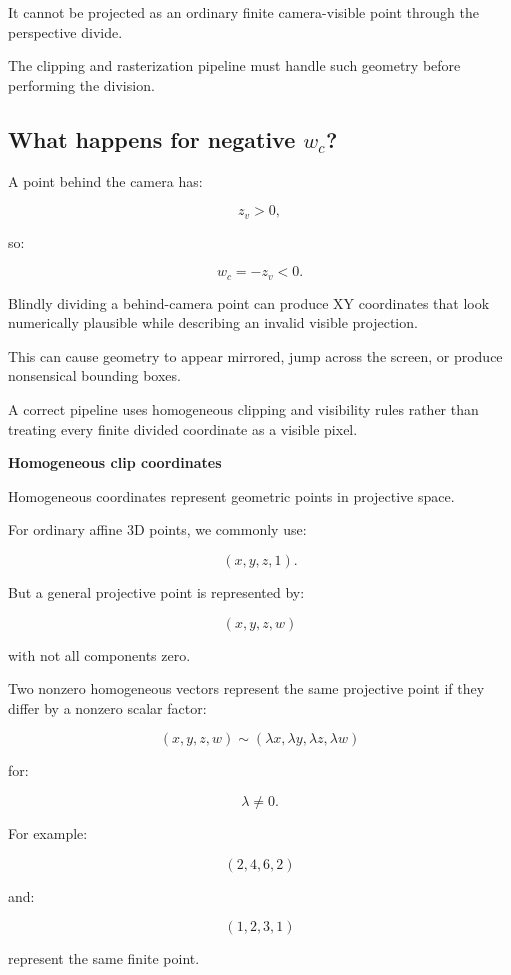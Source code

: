 It cannot be projected as an ordinary finite camera-visible point through the perspective divide.

The clipping and rasterization pipeline must handle such geometry before performing the division.

\subsection{\texorpdfstring{What happens for negative \(w_c\)?}{What happens for negative w\_c?}}\label{02-foundations-ii-ch033-what-happens-for-negative-w_c}

A point behind the camera has:

\[
 z_v>0,
\]

so:

\[
 w_c=-z_v<0.
\]

Blindly dividing a behind-camera point can produce XY coordinates that look numerically plausible while describing an invalid visible projection.

This can cause geometry to appear mirrored, jump across the screen, or produce nonsensical bounding boxes.

A correct pipeline uses homogeneous clipping and visibility rules rather than treating every finite divided coordinate as a visible pixel.

\textbf{Homogeneous clip coordinates}

Homogeneous coordinates represent geometric points in projective space.

For ordinary affine 3D points, we commonly use:

\[
 (x,y,z,1).
\]

But a general projective point is represented by:

\[
 \boxed{ (x,y,z,w) }
\]

with not all components zero.

Two nonzero homogeneous vectors represent the same projective point if they differ by a nonzero scalar factor:

\[
 \boxed{ (x,y,z,w) \sim (\lambda x,\lambda y,\lambda z,\lambda w) }
\]

for:

\[
 \lambda\ne0.
\]

For example:

\[
 (2,4,6,2)
\]

and:

\[
 (1,2,3,1)
\]

represent the same finite point.

